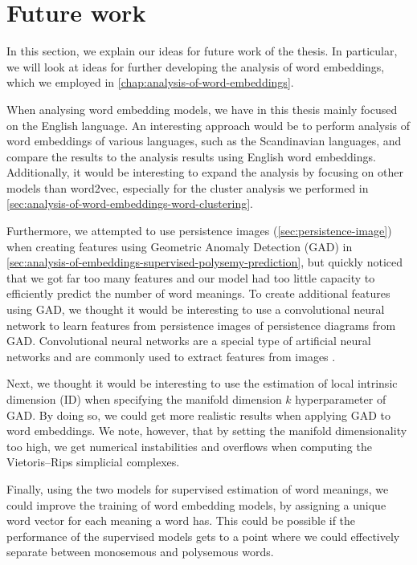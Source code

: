 \section{Future work}
\label{sec:future-work}
In this section, we explain our ideas for future work of the thesis. In particular, we will look at ideas for further developing the analysis of word embeddings, which we employed in \cref{chap:analysis-of-word-embeddings}.

When analysing word embedding models, we have in this thesis mainly focused on the English language. An interesting approach would be to perform analysis of word embeddings of various languages, such as the Scandinavian languages, and compare the results to the analysis results using English word embeddings. Additionally, it would be interesting to expand the analysis by focusing on other models than word2vec, especially for the cluster analysis we performed in \cref{sec:analysis-of-word-embeddings-word-clustering}.

Furthermore, we attempted to use persistence images (\cref{sec:persistence-image}) when creating features using Geometric Anomaly Detection (GAD) in \cref{sec:analysis-of-embeddings-supervised-polysemy-prediction}, but quickly noticed that we got far too many features and our model had too little capacity to efficiently predict the number of word meanings. To create additional features using GAD, we thought it would be interesting to use a convolutional neural network to learn features from persistence images of persistence diagrams from GAD. Convolutional neural networks are a special type of artificial neural networks and are commonly used to extract features from images \cite[Chapter 8]{Aggarwal18}.

Next, we thought it would be interesting to use the estimation of local intrinsic dimension (ID) when specifying the manifold dimension $k$ hyperparameter of GAD. By doing so, we could get more realistic results when applying GAD to word embeddings. We note, however, that by setting the manifold dimensionality too high, we get numerical instabilities and overflows when computing the Vietoris–Rips simplicial complexes.

Finally, using the two models for supervised estimation of word meanings, we could improve the training of word embedding models, by assigning a unique word vector for each meaning a word has. This could be possible if the performance of the supervised models gets to a point where we could effectively separate between monosemous and polysemous words.